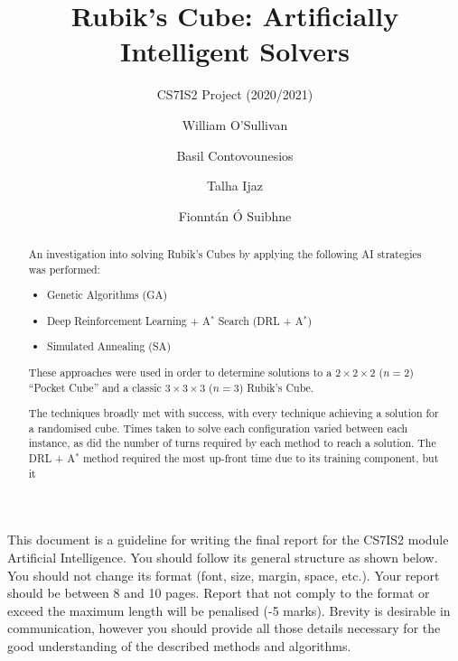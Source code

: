 \documentclass[UKenglish]{svproc}
\title{Rubik's Cube: Artificially Intelligent Solvers}
\subtitle{CS7IS2 Project (2020/2021)}
\author{
  William O'Sullivan   \and
  Basil Contovounesios \and
  Talha Ijaz           \and
  Fionnt\'an \'O Suibhne}
\institute{\email{
    wosulliv@tcd.ie,
    contovob@tcd.ie,
    ijazm@tcd.ie,
    suibhnef@tcd.ie}}
\begin{document}
\mainmatter
\maketitle              %

\begin{abstract}

An investigation into solving Rubik's Cubes by applying the following AI strategies was performed:
\begin{itemize}
    \item Genetic Algorithms (GA)
    \item Deep Reinforcement Learning + A$^{\ast}$ Search (DRL + A$^{\ast}$)
    \item Simulated Annealing (SA)
\end{itemize}
These approaches were used in order to determine solutions to a $2\times 2\times 2$ ($n=2$) ``Pocket Cube'' and a classic $3\times 3\times 3$ ($n=3$) Rubik's Cube.

The techniques broadly met with success, with every technique achieving a solution for a randomised cube. Times taken to solve each configuration varied between each instance, as did the number of turns required by each method to reach a solution. The DRL + A$^{\ast}$ method required the most up-front time due to its training component, but it 




\end{abstract}
%
\iffalse
This document is a guideline for writing the final report for the CS7IS2 module Artificial Intelligence. You should follow its general structure as shown below.
You should not change its format (font, size, margin, space, etc.). 
Your report should be between 8 and 10 pages. Report that not comply to the format or exceed the maximum length will be penalised (-5 marks).
Brevity is desirable in communication, however you should provide all those details necessary for the good understanding of the described methods and algorithms. 
\end{document}
